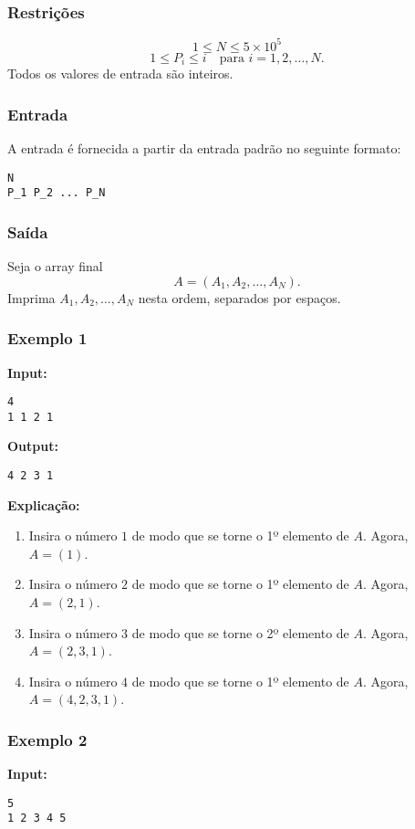 \subsubsection*{Restrições}
\[
1 \leq N \leq 5 \times 10^5
\]
\[
1 \leq P_i \leq i \quad \text{para } i = 1, 2, \dots, N.
\]
Todos os valores de entrada são inteiros.

\subsubsection*{Entrada}
A entrada é fornecida a partir da entrada padrão no seguinte formato:
\begin{verbatim}
N
P_1 P_2 ... P_N
\end{verbatim}

\subsubsection*{Saída}
Seja o array final 
\[
A = (A_1, A_2, \dots, A_N).
\]
Imprima \(A_1, A_2, \dots, A_N\) nesta ordem, separados por espaços.

\subsubsection*{Exemplo 1}
\textbf{Input:}
\begin{verbatim}
4
1 1 2 1
\end{verbatim}

\textbf{Output:}
\begin{verbatim}
4 2 3 1
\end{verbatim}

\textbf{Explicação:}
\begin{enumerate}
    \item Insira o número \(1\) de modo que se torne o 1º elemento de \(A\). Agora, \(A = (1)\).
    \item Insira o número \(2\) de modo que se torne o 1º elemento de \(A\). Agora, \(A = (2, 1)\).
    \item Insira o número \(3\) de modo que se torne o 2º elemento de \(A\). Agora, \(A = (2, 3, 1)\).
    \item Insira o número \(4\) de modo que se torne o 1º elemento de \(A\). Agora, \(A = (4, 2, 3, 1)\).
\end{enumerate}

\subsubsection*{Exemplo 2}
\textbf{Input:}
\begin{verbatim}
5
1 2 3 4 5
\end{verbatim}

